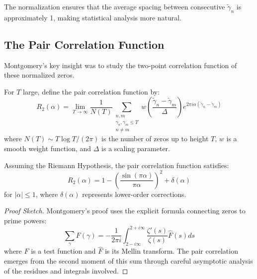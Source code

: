 \begin{remark}
The normalization ensures that the average spacing between consecutive $\tilde{\gamma}_n$ is approximately 1, making statistical analysis more natural.
\end{remark}

\subsection{The Pair Correlation Function}

Montgomery's key insight was to study the two-point correlation function of these normalized zeros.

\begin{definition}
\label{def:montgomery_pair_correlation}
For $T$ large, define the pair correlation function by:
\begin{equation}
R_2(\alpha) = \lim_{T \to \infty} \frac{1}{N(T)} \sum_{\substack{n,m \\ \gamma_n, \gamma_m \leq T \\ n \neq m}} w\left(\frac{\tilde{\gamma}_n - \tilde{\gamma}_m}{\Delta}\right) e^{2\pi i \alpha (\tilde{\gamma}_n - \tilde{\gamma}_m)}
\label{eq:montgomery_correlation}
\end{equation}
where $N(T) \sim T \log T/(2\pi)$ is the number of zeros up to height $T$, $w$ is a smooth weight function, and $\Delta$ is a scaling parameter.
\end{definition}

\begin{theorem}
\label{thm:montgomery_conjecture}
Assuming the Riemann Hypothesis, the pair correlation function satisfies:
\begin{equation}
R_2(\alpha) = 1 - \left(\frac{\sin(\pi \alpha)}{\pi \alpha}\right)^2 + \delta(\alpha)
\label{eq:montgomery_formula}
\end{equation}
for $|\alpha| \leq 1$, where $\delta(\alpha)$ represents lower-order corrections.
\end{theorem}

\begin{proof}[Proof Sketch]
Montgomery's proof uses the explicit formula connecting zeros to prime powers:
\begin{equation}
\sum_{\gamma} F(\gamma) = -\frac{1}{2\pi i} \int_{2-i\infty}^{2+i\infty} \frac{\zeta'(s)}{\zeta(s)} \hat{F}(s) ds
\end{equation}
where $F$ is a test function and $\hat{F}$ is its Mellin transform. The pair correlation emerges from the second moment of this sum through careful asymptotic analysis of the residues and integrals involved.
\end{proof}

